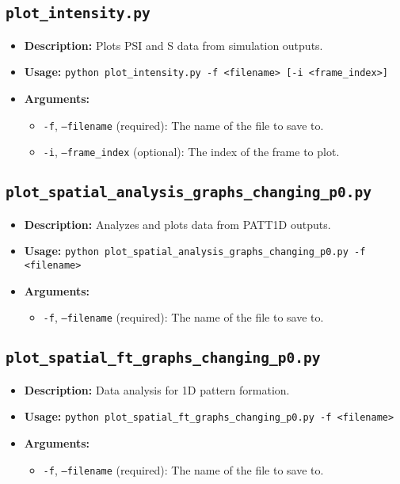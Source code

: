 \documentclass{article}
\begin{document}
\subsection{\texttt{plot\_intensity.py}}
\begin{itemize}
    \item \textbf{Description:} Plots PSI and S data from simulation outputs.
    \item \textbf{Usage:} \texttt{python plot\_intensity.py -f <filename> [-i <frame\_index>]}
    \item \textbf{Arguments:}
    \begin{itemize}
        \item \texttt{-f}, \texttt{--filename} (required): The name of the file to save to.
        \item \texttt{-i}, \texttt{--frame\_index} (optional): The index of the frame to plot.
    \end{itemize}
\end{itemize}

\subsection{\texttt{plot\_spatial\_analysis\_graphs\_changing\_p0.py}}
\begin{itemize}
    \item \textbf{Description:} Analyzes and plots data from PATT1D outputs.
    \item \textbf{Usage:} \texttt{python plot\_spatial\_analysis\_graphs\_changing\_p0.py -f <filename>}
    \item \textbf{Arguments:}
    \begin{itemize}
        \item \texttt{-f}, \texttt{--filename} (required): The name of the file to save to.
    \end{itemize}
\end{itemize}

\subsection{\texttt{plot\_spatial\_ft\_graphs\_changing\_p0.py}}
\begin{itemize}
    \item \textbf{Description:} Data analysis for 1D pattern formation.
    \item \textbf{Usage:} \texttt{python plot\_spatial\_ft\_graphs\_changing\_p0.py -f <filename>}
    \item \textbf{Arguments:}
    \begin{itemize}
        \item \texttt{-f}, \texttt{--filename} (required): The name of the file to save to.
    \end{itemize}
\end{itemize}
\end{document}
